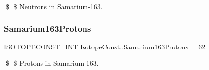 \$ \$ Neutrons in Samarium-\/163. \mbox{\label{group___isotope_const-_samarium-_sm163_gacbe137b7e8a69995b567d79e406d5e3d}} 
\subsubsection{\texorpdfstring{Samarium163\+Protons}{Samarium163Protons}}
{\footnotesize\ttfamily \mbox{\hyperlink{group___isotope_const-_macros_ga5f18360b3e99483a35c32d789e62621c}{I\+S\+O\+T\+O\+P\+E\+C\+O\+N\+S\+T\+\_\+\+I\+NT}} Isotope\+Const\+::\+Samarium163\+Protons = 62}

\$ \$ Protons in Samarium-\/163. 